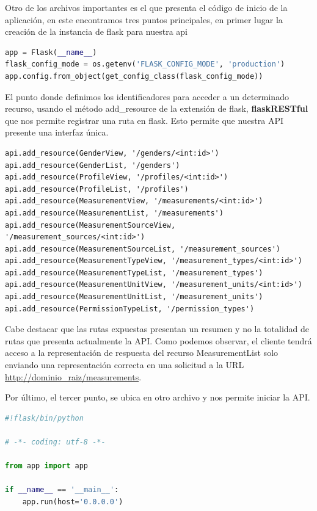 Otro de los archivos importantes es el que presenta el código de inicio de la aplicación, en este encontramos tres puntos principales, en primer lugar la creación de la instancia de flask para nuestra api

\begin{lstlisting}[language=Python]
app = Flask(__name__)
flask_config_mode = os.getenv('FLASK_CONFIG_MODE', 'production')
app.config.from_object(get_config_class(flask_config_mode))
\end{lstlisting}

El punto donde definimos los identificadores para acceder a un determinado recurso, usando el método add\_resource de la extensión de flask, \textbf{flaskRESTful} que nos permite registrar una ruta en flask. Esto permite que nuestra API presente una interfaz única.

\begin{lstlisting}
api.add_resource(GenderView, '/genders/<int:id>')
api.add_resource(GenderList, '/genders')
api.add_resource(ProfileView, '/profiles/<int:id>')
api.add_resource(ProfileList, '/profiles')
api.add_resource(MeasurementView, '/measurements/<int:id>')
api.add_resource(MeasurementList, '/measurements')
api.add_resource(MeasurementSourceView, '/measurement_sources/<int:id>')
api.add_resource(MeasurementSourceList, '/measurement_sources')
api.add_resource(MeasurementTypeView, '/measurement_types/<int:id>')
api.add_resource(MeasurementTypeList, '/measurement_types')
api.add_resource(MeasurementUnitView, '/measurement_units/<int:id>')
api.add_resource(MeasurementUnitList, '/measurement_units')
api.add_resource(PermissionTypeList, '/permission_types')
\end{lstlisting}

\begin{sloppypar}
Cabe destacar que las rutas expuestas presentan un resumen y no la totalidad de rutas que presenta actualmente la API.
Como podemos observar, el cliente tendrá acceso a la representación de respuesta del recurso MeasurementList solo enviando una representación correcta en una solicitud a la URL \url{http://dominio_raiz/measurements}.
\end{sloppypar}

Por último, el tercer punto, se ubica en otro archivo y nos permite iniciar la API.

\begin{lstlisting}[language=Python]
#!flask/bin/python

# -*- coding: utf-8 -*-

from app import app

if __name__ == '__main__':
    app.run(host='0.0.0.0')
\end{lstlisting}

